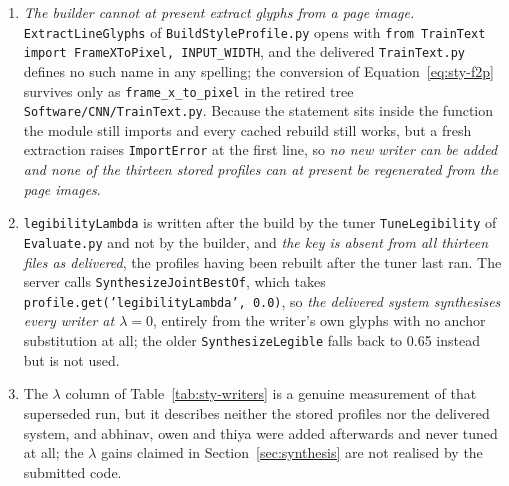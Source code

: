 \begin{enumerate}\setlength{\itemsep}{0pt}\setlength{\parskip}{0pt}
\item \emph{The builder cannot at present extract glyphs from a page image.} \texttt{ExtractLineGlyphs} of \texttt{BuildStyleProfile.py} opens with \texttt{from TrainText import FrameXToPixel,\,INPUT\_WIDTH}, and the delivered \texttt{TrainText.py} defines no such name in any spelling; the conversion of Equation~\ref{eq:sty-f2p} survives only as \texttt{frame\_x\_to\_pixel} in the retired tree \texttt{Software/CNN/TrainText.py}. Because the statement sits inside the function the module still imports and every cached rebuild still works, but a fresh extraction raises \texttt{ImportError} at the first line, so \emph{no new writer can be added and none of the thirteen stored profiles can at present be regenerated from the page images}.
\item \texttt{legibilityLambda} is written after the build by the tuner \texttt{TuneLegibility} of \texttt{Evaluate.py} and not by the builder, and \emph{the key is absent from all thirteen files as delivered}, the profiles having been rebuilt after the tuner last ran. The server calls \texttt{SynthesizeJointBestOf}, which takes \texttt{profile.get('legibilityLambda',\,0.0)}, so \emph{the delivered system synthesises every writer at $\lambda=0$}, entirely from the writer's own glyphs with no anchor substitution at all; the older \texttt{SynthesizeLegible} falls back to 0.65 instead but is not used.
\item The $\lambda$ column of Table~\ref{tab:sty-writers} is a genuine measurement of that superseded run, but it describes neither the stored profiles nor the delivered system, and abhinav, owen and thiya were added afterwards and never tuned at all; the $\lambda$ gains claimed in Section~\ref{sec:synthesis} are not realised by the submitted code.

\end{enumerate}
